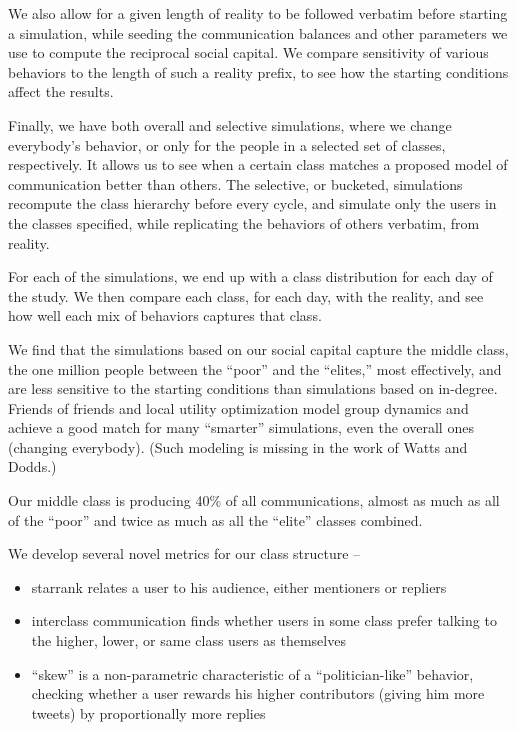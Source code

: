 \documentclass[10pt,oneside]{memoir}
\begin{document}
\begin{Spacing}{2}
We also allow for a given length of reality to be followed verbatim before starting a simulation, while seeding the communication balances and other parameters we use to compute the reciprocal social capital.  We compare sensitivity of various behaviors to the length of such a reality prefix, to see how the starting conditions affect the results.


Finally, we have both overall and selective simulations, where we change everybody's behavior, or only for the people in a selected set of classes, respectively.  It allows us to see when a certain class matches a proposed model of communication better than others.  The selective, or bucketed, simulations recompute the class hierarchy before every cycle, and simulate only the users in the classes specified, while replicating the behaviors of others verbatim, from reality.


For each of the simulations, we end up with a class distribution for each day of the study.  We then compare each class, for each day, with the reality, and see how well each mix of behaviors captures that class.


We find that the simulations based on our social capital capture the middle class, the one million people between the ``poor'' and the ``elites,'' most effectively, and are less sensitive to the starting conditions than simulations based on in-degree.  Friends of friends and local utility optimization model group dynamics and achieve a good match for many ``smarter'' simulations, even the overall ones (changing everybody).  (Such modeling is missing in the work of Watts and Dodds.)  


Our middle class is producing 40\% of all communications, almost as much as all of the ``poor'' and twice as much as all the ``elite'' classes combined.  


We develop several novel metrics for our class structure --


\begin{itemize}


\item starrank relates a user to his audience, either mentioners or repliers

\item interclass communication finds whether users in some class prefer talking to the higher, lower, or same class users as themselves

\item ``skew'' is a non-parametric characteristic of a ``politician-like'' behavior, checking whether a user rewards his higher contributors (giving him more tweets) by proportionally more replies
\end{itemize}


\end{Spacing}
\end{document}
